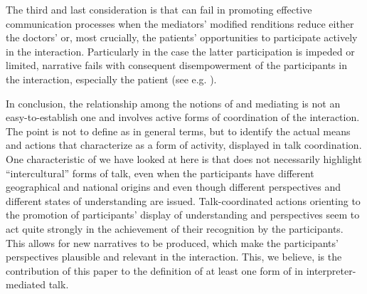 \documentclass[output=paper]{LSP/langsci}
\begin{document}
The third and last consideration is that  can fail in promoting effective communication processes when the  mediators' modified renditions reduce either the doctors' or, most crucially, the patients' opportunities to participate actively in the interaction. Particularly in the case the latter participation is impeded or limited, narrative  fails with consequent disempowerment of the participants in the interaction, especially the patient (see e.g. \citealt{Baraldi2014, Baraldi2008, Bolden2000, Davidson2000}).

In conclusion, the relationship among the notions of  and mediating is not an easy-to-establish one and involves active forms of coordination of the interaction. The point is not to define  as  in general terms, but to identify the actual means and actions that characterize  as a form of  activity, displayed in talk coordination. One characteristic of  we have looked at here is that  does not necessarily highlight ``intercultural'' forms of talk, even when the participants have different geographical and national origins and even though different perspectives and different states of understanding are issued. Talk-coordinated actions orienting to the promotion of participants' display of understanding and perspectives seem to act quite strongly in the achievement of their recognition by the participants. This allows for new narratives to be produced, which make the participants' perspectives plausible and relevant in the interaction. This, we believe, is the contribution of this paper to the definition of at least one form of  in interpreter-mediated talk.

\newpage 
\sloppy
\printbibliography[heading=subbibliography,notkeyword=this]

\captionsetup[figure]{name=Figure} %
\end{document}
